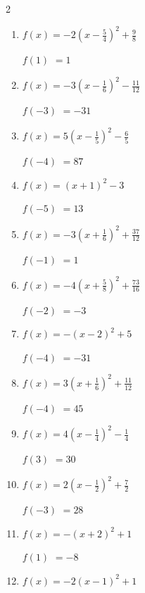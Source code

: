 \begin{multicols}{2}
\begin{enumerate}
  \item $\displaystyle f(x)=-2\left( x-\frac{5}{4}\right)^{2}+\frac{9}{8}$

$f(1)$
        $=1$

  \item $\displaystyle f(x)=-3\left( x-\frac{1}{6}\right)^{2}-\frac{11}{12}$

$f(-3)$
        $=-31$

  \item $\displaystyle f(x)=5\left( x-\frac{1}{5}\right)^{2}-\frac{6}{5}$

$f(-4)$
        $=87$

  \item $\displaystyle f(x)=\left( x+1\right)^{2}-3$

$f(-5)$
        $=13$

\columnbreak %

\resetques

  \item $\displaystyle f(x)=-3\left( x+\frac{1}{6}\right)^{2}+\frac{37}{12}$

$f(-1)$
        $=1$

  \item $\displaystyle f(x)=-4\left( x+\frac{5}{8}\right)^{2}+\frac{73}{16}$

$f(-2)$
        $=-3$

  \item $\displaystyle f(x)=-\left( x-2\right)^{2}+5$

$f(-4)$
        $=-31$

  \item $\displaystyle f(x)=3\left( x+\frac{1}{6}\right)^{2}+\frac{11}{12}$

$f(-4)$
        $=45$

  \item $\displaystyle f(x)=4\left( x-\frac{1}{4}\right)^{2}-\frac{1}{4}$

$f(3)$
        $=30$

\columnbreak %

  \item $\displaystyle f(x)=2\left( x-\frac{1}{2}\right)^{2}+\frac{7}{2}$

$f(-3)$
        $=28$

  \item $\displaystyle f(x)=-\left( x+2\right)^{2}+1$

$f(1)$
        $=-8$

  \item $\displaystyle f(x)=-2\left( x-1\right)^{2}+1$


\end{enumerate}
\end{multicols}
